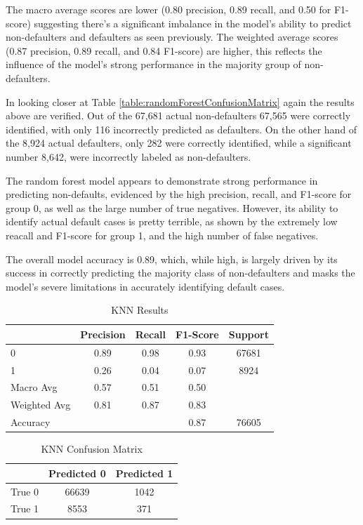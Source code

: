 \documentclass[12pt]{article}
\begin{document}
The macro average scores are lower (0.80 precision, 0.89 recall, and 0.50 for F1-score) suggesting there's a significant imbalance in the model's ability to predict non-defaulters and defaulters as seen previously. The weighted average scores (0.87 precision, 0.89 recall, and 0.84 F1-score) are higher, this reflects the influence of the model's strong performance in the majority group of non-defaulters.

In looking closer at Table \ref{table:randomForestConfusionMatrix} again the results above are verified. Out of the 67,681 actual non-defaulters 67,565 were correctly identified, with only 116 incorrectly predicted as defaulters. On the other hand of the 8,924 actual defaulters, only 282 were correctly identified, while a significant number 8,642, were incorrectly labeled as non-defaulters.

The random forest model appears to demonstrate strong performance in predicting non-defaults, evidenced by the high precision, recall, and F1-score for group 0, as well as the large number of true negatives. However, its ability to identify actual default cases is pretty terrible, as shown by the extremely low reacall and F1-score for group 1, and the high number of false negatives.

The overall model accuracy is 0.89, which, while high, is largely driven by its success in correctly predicting the majority class of non-defaulters and masks the model's severe limitations in accurately identifying default cases.

\begin{table}[htbp]
    \centering
    \caption{KNN Results}
    \begin{tabular}{lcccc}
        \toprule
        & Precision & Recall & F1-Score & Support \\
        \midrule
        0 & 0.89 & 0.98 & 0.93 & 67681 \\
        1 & 0.26 & 0.04 & 0.07 & 8924 \\
        Macro Avg & 0.57 & 0.51 & 0.50 & \\
        Weighted Avg & 0.81 & 0.87 & 0.83 & \\
        \midrule
        Accuracy & & & 0.87 & 76605 \\
        \bottomrule
    \end{tabular}
    \label{table:kNNResults}
\end{table}

\begin{table}[htbp]
    \centering
    \caption{KNN Confusion Matrix}
    \begin{tabular}{lcc}
        \toprule
        & Predicted 0 & Predicted 1 \\
        \midrule
        True 0 & 66639 & 1042 \\
        True 1 & 8553 & 371 \\
        \bottomrule
    \end{tabular}
    \label{table:kNNConfusionMatrix}
\end{table}
\end{document}
